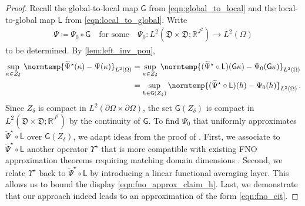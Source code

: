 \documentclass[pdflatex,sn-mathphys-num]{sn-jnl-preprint}
\newcommand{\R}{\mathbb{R}}
\newcommand{\sfG}{\mathsf{G}}
\newcommand{\sfL}{\mathsf{L}}
\newcommand{\pOmega}{{\partial\Omega}}
\newcommand{\norm}{\normtemp}
\newcommand{\defeq}{\coloneqq} %
\theoremstyle{thmstyleone}%
\theoremstyle{thmstyletwo}%
\theoremstyle{thmstylethree}%
\numberwithin{equation}{section}
\numberwithin{theorem}{section}
\begin{document}
\begin{proof}
    Recall the global-to-local map $\sfG$ from \eqref{eqn:global_to_local} and the local-to-global map $\sfL$ from \eqref{eqn:local_to_global}. Write
    \begin{align*}
        \Psi\defeq \Psi_0\circ\sfG\quad \text{for some}\quad\Psi_0\colon L^2(\mathfrak{D}\times \mathfrak{D};\R^{J^2})\to L^2(\Omega)
    \end{align*}
    to be determined.
    By \cref{lem:left_inv_pou},
    \begin{align}\label{eqn:fno_approx_claim_h}
        \begin{split}
            \sup_{\kappa\in Z_\delta}\,\norm{\widetilde{\Psi}^\star(\kappa) - \Psi(\kappa)}_{L^2(\Omega)}&=\sup_{\kappa\in Z_\delta}\,\norm{(\widetilde{\Psi}^\star\circ \sfL)(\sfG \kappa)-\Psi_0(\sfG \kappa)}_{L^2(\Omega)}\\
            &= \sup_{h\in \sfG(Z_\delta)}\norm{(\widetilde{\Psi}^\star\circ \sfL)(h)-\Psi_0(h)}_{L^2(\Omega)}\,.
        \end{split}
    \end{align}
    Since $Z_\delta$ is compact in $L^2(\pOmega\times\pOmega)$, the set $\sfG(Z_\delta)$ is compact in $L^2(\mathfrak{D}\times \mathfrak{D};\R^{J^2})$ by the continuity of $\sfG$. To find $\Psi_0$ that uniformly approximates $\widetilde{\Psi}^\star\circ \sfL$ over $\sfG(Z_\delta)$, we adapt ideas from the proof of \cite[Thm.~3.2, pp.~34--35]{huang2025operator}. First, we associate to $\widetilde{\Psi}^\star\circ \sfL$ another operator $\Upsilon^\star$ that is more compatible with existing FNO approximation theorems requiring matching domain dimensions \cite[Sec.~2]{kovachki2021universal}. Second, we relate $\Upsilon^\star$ back to $\widetilde{\Psi}^\star\circ \sfL$ by introducing a linear functional averaging layer. This allows us to bound the display \eqref{eqn:fno_approx_claim_h}. Last, we demonstrate that our approach indeed leads to an approximation of the form \eqref{eqn:fno_eit}.


\end{proof}
\end{document}
